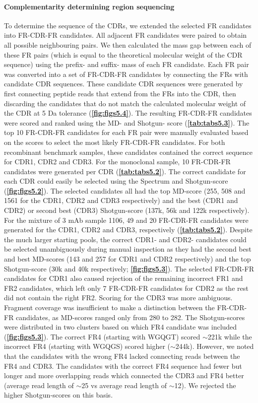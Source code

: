 \paragraph{Complementarity determining region sequencing}
\label{ch:cdr}
To determine the sequence of the CDRs, we extended the selected FR candidates into FR-CDR-FR candidates. All adjacent FR candidates were paired to obtain all possible neighbouring pairs. We then calculated the mass gap between each of these FR pairs (which is equal to the theoretical molecular weight of the CDR sequence) using the prefix- and suffix- mass of each FR candidate. Each FR pair was converted into a set of FR-CDR-FR candidates by connecting the FRs with candidate CDR sequences. These candidate CDR sequences were generated by first connecting peptide reads that extend from the FRs into the CDR, then discarding the candidates that do not match the calculated molecular weight of the CDR at 5 Da tolerance (\textbf{\autoref{fig:figs5.4}}). The resulting FR-CDR-FR candidates were scored and ranked using the MD- and Shotgun- score (\textbf{\autoref{tab:tabs5.3}}).
The top 10 FR-CDR-FR candidates for each FR pair were manually evaluated based on the scores to select the most likely FR-CDR-FR candidates. For both recombinant benchmark samples, these candidates contained the correct sequence for CDR1, CDR2 and CDR3. For the monoclonal sample, 10 FR-CDR-FR candidates were generated per CDR (\textbf{\autoref{tab:tabs5.2}}). The correct candidate for each CDR could easily be selected using the Spectrum and Shotgun-score (\textbf{\autoref{fig:figs5.2}}). The selected candidates all had the top MD-score (255, 508 and 1561 for the CDR1, CDR2 and CDR3 respectively) and the best (CDR1 and CDR2) or second best (CDR3) Shotgun-score (137k, 56k and 122k respectively).
For the mixture of 3 mAb sample 1106, 49 and 20 FR-CDR-FR candidates were generated for the CDR1, CDR2 and CDR3, respectively (\textbf{\autoref{tab:tabs5.2}}). Despite the much larger starting pools, the correct CDR1- and CDR2- candidates could be selected unambiguously during manual inspection as they had the second best and best MD-scores (143 and 257 for CDR1 and CDR2 respectively) and the top Shotgun-score (30k and 40k respectively; \textbf{\autoref{fig:figs5.3}}). The selected FR-CDR-FR candidates for CDR1 also caused rejection of the remaining incorrect FR1 and FR2 candidates, which left only 7 FR-CDR-FR candidates for CDR2 as the rest did not contain the right FR2.
Scoring for the CDR3 was more ambiguous. Fragment coverage was insufficient to make a distinction between the FR-CDR-FR candidates, as MD-scores ranged only from 280 to 282. The Shotgun-scores were distributed in two clusters based on which FR4 candidate was included (\textbf{\autoref{fig:figs5.3}}). The correct FR4 (starting with WGQGT) scored $\sim$221k while the incorrect FR4 (starting with WGQGS) scored higher ($\sim$244k). However, we noted that the candidates with the wrong FR4 lacked connecting reads between the FR4 and CDR3. The candidates with the correct FR4 sequence had fewer but longer and more overlapping reads which connected the CDR3 and FR4 better (average read length of $\sim$25 vs average read length of $\sim$12). We rejected the higher Shotgun-scores on this basis.
